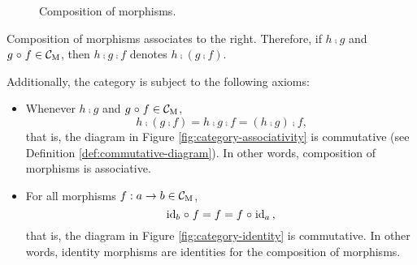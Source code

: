 \begin{definition}
\begin{itemize}
\begin{figure}[htbp]
\begin{center}
      \end{center}
      \caption{Composition of morphisms.}
      \label{fig:category-composition}
    \end{figure}

    Composition of morphisms associates to the right. Therefore, if $h
    \comp g$ and $g \mathrel{\circ} f \in \mathcal{C}_{\operatorname{M}}$, then $h \comp g \comp f$
    denotes $h \comp (g \comp f)$.

  \end{itemize}
  Additionally, the category  is subject to the following
  axioms:
  \begin{itemize}
  \item

    Whenever $h \comp g$ and $g \mathrel{\circ} f \in \mathcal{C}_{\operatorname{M}}$,
    \begin{equation}
      \label{eq:category-associativity}
      h \comp (g \comp f) = h \comp g \comp f = (h \comp g) \comp f
      \text{,}
    \end{equation}
    that is, the diagram in Figure \ref{fig:category-associativity} is
    commutative (see Definition \ref{def:commutative-diagram}). In
    other words, composition of morphisms is associative.

  \item

    For all morphisms $f: a \to b \in \mathcal{C}_{\operatorname{M}}$,
    \begin{equation}
      \label{eq:category-identity}
      \operatorname{id}_{b} \mathrel{\circ} f = f = f \mathrel{\circ} \operatorname{id}_{a}
      \text{,}
    \end{equation}
    that is, the diagram in Figure \ref{fig:category-identity} is
    commutative. In other words, identity morphisms are identities for
    the composition of morphisms.

    \begin{figure}
      \begin{subfigure}[b]{0.5\linewidth}
        \begin{center}
\end{center}
\end{subfigure}
\end{figure}
\end{itemize}
\end{definition}
